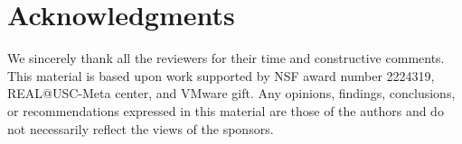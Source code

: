 \section*{Acknowledgments}
We sincerely thank all the reviewers for their time and constructive comments. This material is based upon work supported by NSF award number 2224319, REAL@USC-Meta center, and VMware gift. Any opinions, findings, conclusions, or recommendations expressed in this material are those of the authors and do not necessarily reflect the views of the sponsors.
